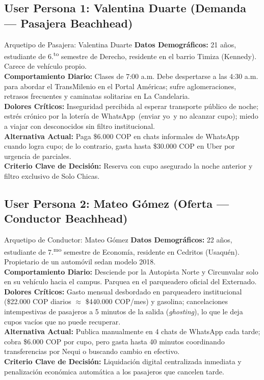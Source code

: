 \documentclass[11pt,a4paper]{article}
\begin{document}
\subsection{User Persona 1: Valentina Duarte (Demanda --- Pasajera Beachhead)}
\begin{evidencebox}{Arquetipo de Pasajera: Valentina Duarte}
\textbf{Datos Demogr\'aficos:} 21 a\~nos, estudiante de 6.\textsuperscript{to} semestre de Derecho, residente en el barrio Timiza (Kennedy). Carece de veh\'iculo propio.\\
\textbf{Comportamiento Diario:} Clases de 7:00 a.m. Debe despertarse a las 4:30 a.m. para abordar el TransMilenio en el Portal Am\'ericas; sufre aglomeraciones, retrasos frecuentes y caminatas solitarias en La Candelaria.\\
\textbf{Dolores Cr\'iticos:} Inseguridad percibida al esperar transporte p\'ublico de noche; estr\'es cr\'onico por la \guillemotleft loter\'ia de WhatsApp\guillemotright\ (enviar \guillemotleft yo\guillemotright\ y no alcanzar cupo); miedo a viajar con desconocidos sin filtro institucional.\\
\textbf{Alternativa Actual:} Paga \$6.000 COP en chats informales de WhatsApp cuando logra cupo; de lo contrario, gasta hasta \$30.000 COP en Uber por urgencia de parciales.\\
\textbf{Criterio Clave de Decisi\'on:} Reserva con cupo asegurado la noche anterior y filtro exclusivo de \guillemotleft Solo Chicas\guillemotright.
\end{evidencebox}

\subsection{User Persona 2: Mateo G\'omez (Oferta --- Conductor Beachhead)}
\begin{evidencebox}{Arquetipo de Conductor: Mateo G\'omez}
\textbf{Datos Demogr\'aficos:} 22 a\~nos, estudiante de 7.\textsuperscript{mo} semestre de Econom\'ia, residente en Cedritos (Usaqu\'en). Propietario de un autom\'ovil sedan modelo 2018.\\
\textbf{Comportamiento Diario:} Desciende por la Autopista Norte y Circunvalar solo en su veh\'iculo hacia el campus. Parquea en el parqueadero oficial del Externado.\\
\textbf{Dolores Cr\'iticos:} Gasto mensual desbordado en parqueadero institucional (\$22.000 COP diarios $\approx$ \$440.000 COP/mes) y gasolina; cancelaciones intempestivas de pasajeros a 5 minutos de la salida (\textit{ghosting}), lo que le deja cupos vac\'ios que no puede recuperar.\\
\textbf{Alternativa Actual:} Publica manualmente en 4 chats de WhatsApp cada tarde; cobra \$6.000 COP por cupo, pero gasta hasta 40 minutos coordinando transferencias por Nequi o buscando cambio en efectivo.\\
\textbf{Criterio Clave de Decisi\'on:} Liquidaci\'on digital centralizada inmediata y penalizaci\'on econ\'omica autom\'atica a los pasajeros que cancelen tarde.
\end{evidencebox}
\end{document}

